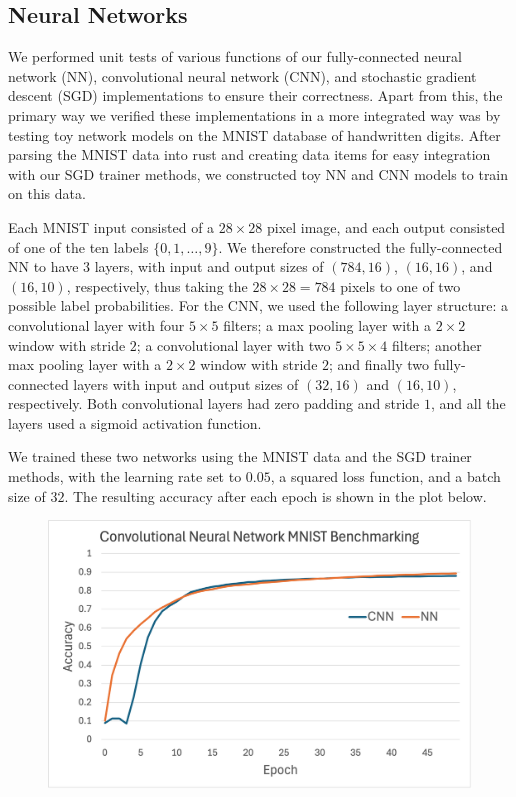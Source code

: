 \subsection{Neural Networks}
We performed unit tests of various functions of our fully-connected neural network (NN), convolutional neural network (CNN), and stochastic gradient descent (SGD) implementations to ensure their correctness.
Apart from this, the primary way we verified these implementations in a more integrated way was by testing toy network models on the MNIST database of handwritten digits\textcolor{blue}{\autocite{MNIST_Dataset}}.
After parsing the MNIST data into rust and creating data items for easy integration with our SGD trainer methods, we constructed toy NN and CNN models to train on this data.

Each MNIST input consisted of a $28 \times 28$ pixel image, and each output consisted of one of the ten labels $\{0, 1, \dots, 9\}$.
We therefore constructed the fully-connected NN to have 3 layers, with input and output sizes of $(784, 16)$, $(16, 16)$, and $(16, 10)$, respectively, thus taking the $28 \times 28 = 784$ pixels to one of two possible label probabilities.
For the CNN, we used the following layer structure: a convolutional layer with four $5 \times 5$ filters; a max pooling layer with a $2 \times 2$ window with stride $2$; a convolutional layer with two $5 \times 5 \times 4$ filters; another max pooling layer with a $2 \times 2$ window with stride $2$; and finally two fully-connected layers with input and output sizes of $(32, 16)$ and $(16, 10)$, respectively. Both convolutional layers had zero padding and stride $1$, and all the layers used a sigmoid activation function.

We trained these two networks using the MNIST data and the SGD trainer methods, with the learning rate set to $0.05$, a squared loss function, and a batch size of $32$.
The resulting accuracy after each epoch is shown in the plot below.

\begin{figure}[H]
  \includegraphics[width=\textwidth]{images/CNNBenchmarking.png}
\end{figure}

